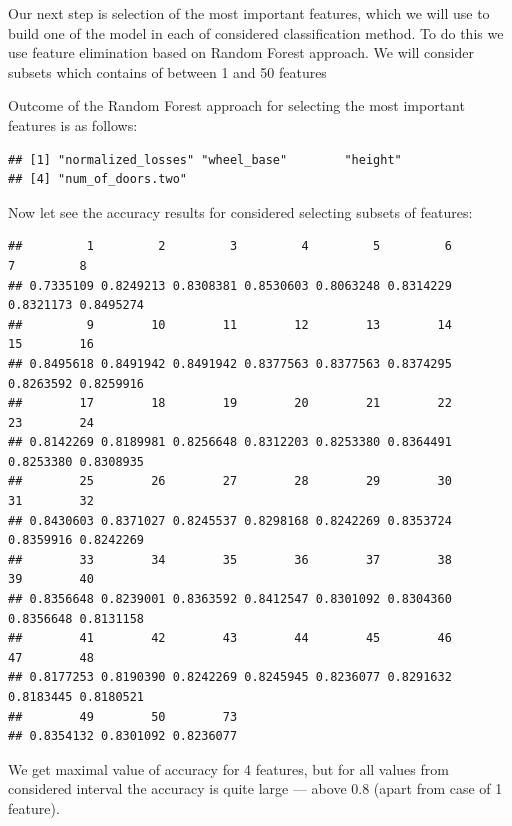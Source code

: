 \documentclass[11pt,a4paper]{article}\usepackage[]{graphicx}\usepackage[]{xcolor}
\makeatletter
\newenvironment{kframe}{%
 \def\at@end@of@kframe{}%
 \ifinner\ifhmode%
  \def\at@end@of@kframe{\end{minipage}}%
  \begin{minipage}{\columnwidth}%
 \fi\fi%
 \def\FrameCommand##1{\hskip\@totalleftmargin \hskip-\fboxsep
 \colorbox{shadecolor}{##1}\hskip-\fboxsep
     \hskip-\linewidth \hskip-\@totalleftmargin \hskip\columnwidth}%
 \MakeFramed {\advance\hsize-\width
   \@totalleftmargin\z@ \linewidth\hsize
   \@setminipage}}%
 {\par\unskip\endMakeFramed%
 \at@end@of@kframe}
\newenvironment{knitrout}{}{} %
\makeatother
\begin{document}
	


	
	Our next step is selection of the most important features, which we will use to build one of the model in each of considered classification method. To do this we  use feature elimination based on Random Forest approach. We will consider subsets which contains of between 1 and 50 features

	Outcome of the Random Forest approach for selecting the most important features is as follows:
\begin{knitrout}
\color{fgcolor}\begin{kframe}
\begin{verbatim}
## [1] "normalized_losses" "wheel_base"        "height"           
## [4] "num_of_doors.two"
\end{verbatim}
\end{kframe}
\end{knitrout}
	Now let see the accuracy results for considered selecting subsets of features:
\begin{knitrout}
\color{fgcolor}\begin{kframe}
\begin{verbatim}
##         1         2         3         4         5         6         7         8 
## 0.7335109 0.8249213 0.8308381 0.8530603 0.8063248 0.8314229 0.8321173 0.8495274 
##         9        10        11        12        13        14        15        16 
## 0.8495618 0.8491942 0.8491942 0.8377563 0.8377563 0.8374295 0.8263592 0.8259916 
##        17        18        19        20        21        22        23        24 
## 0.8142269 0.8189981 0.8256648 0.8312203 0.8253380 0.8364491 0.8253380 0.8308935 
##        25        26        27        28        29        30        31        32 
## 0.8430603 0.8371027 0.8245537 0.8298168 0.8242269 0.8353724 0.8359916 0.8242269 
##        33        34        35        36        37        38        39        40 
## 0.8356648 0.8239001 0.8363592 0.8412547 0.8301092 0.8304360 0.8356648 0.8131158 
##        41        42        43        44        45        46        47        48 
## 0.8177253 0.8190390 0.8242269 0.8245945 0.8236077 0.8291632 0.8183445 0.8180521 
##        49        50        73 
## 0.8354132 0.8301092 0.8236077
\end{verbatim}
\end{kframe}
\end{knitrout}
	
	We get maximal value of accuracy for 4 features, but for all values from considered interval the accuracy is quite large --- above 0.8 (apart from case of 1 feature).
\end{document}
